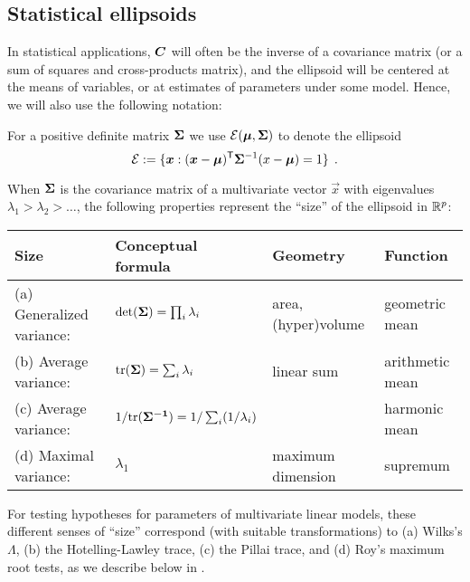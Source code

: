 \subsection{Statistical ellipsoids}\label{sec:statistical}

In statistical applications, $\bm{C}$ will often be the inverse of a covariance
matrix (or a sum of squares and cross-products matrix), and the ellipsoid will
be centered at the means of variables, or at estimates of parameters under some model.
Hence, we will also use the following notation:

For a positive definite matrix
$\bm{\Sigma}$ we use $\mathcal{E}(\bm{\mu},\bm{\Sigma})$ to denote the ellipsoid
\begin{equation}\label{eq:ellipsoid3}
\mathcal{E} := \{ \bm{x} : (\bm{x}-\bm{\mu})^\mathsf{T} \bm{\Sigma}^{-1} (x-\bm{\mu}) = 1 \} \:\: .
 \end{equation}

When $\bm{\Sigma}$ is the covariance matrix of a multivariate vector $\vec{x}$ with eigenvalues
$\lambda_1 > \lambda_2 > \dots$,
the following
properties represent the ``size'' of the ellipsoid in $\mathbb{R}^{p}$:

\begin{tabular}{llll}
    Size                   &  Conceptual formula                    & Geometry       & Function \\
\hline
(a) Generalized variance:  & $\mathrm{det} (\bm{\Sigma}) = \prod_i \lambda_i$ & area, (hyper)volume & geometric mean\\  
(b) Average variance:        & $\mathrm{tr} (\bm{\bm{\Sigma}}) = \sum_i \lambda_i $ & linear sum & arithmetic mean\\     %
(c) Average variance:        & $1/ \mathrm{tr} (\bm{\bm{\Sigma}^{-1}}) = 1/\sum_i (1/\lambda_i) $ &  & harmonic mean\\
(d) Maximal variance:      & $\lambda_1$ & maximum dimension & supremum
 \end{tabular}
\medskip

\noindent For testing hypotheses for parameters of multivariate linear models, these different senses of ``size''
correspond (with suitable transformations) to (a) Wilks's $\Lambda$,
(b) the Hotelling-Lawley  trace, (c) the Pillai trace, and (d) Roy's maximum root tests, as we describe
below in .

